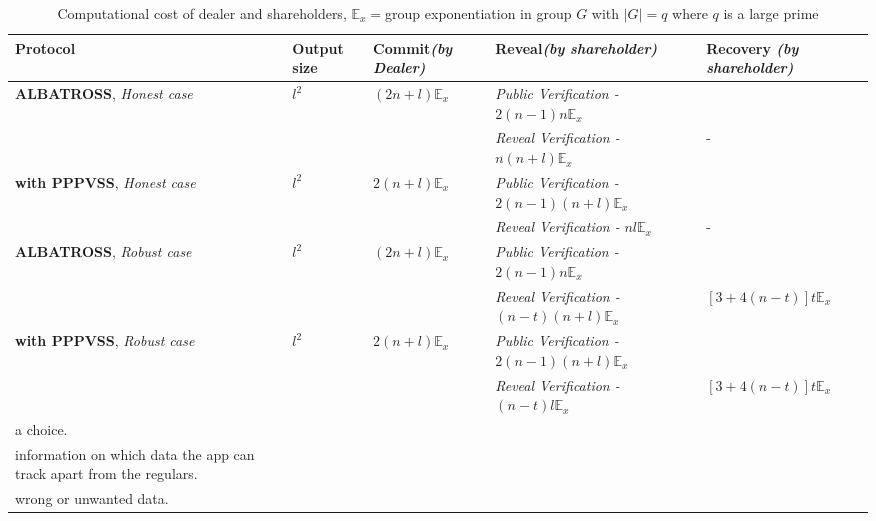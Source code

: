 \begin{table}[H]
\centering
\begin{tabular}{|p{3cm}|p{1.2cm}|p{2cm}|p{6.5cm}|p{2.5cm}|}
\hline
\textbf{Protocol}    & \textbf{Output size}    & 
\textbf{Commit}\textit{(by Dealer)} & \textbf{Reveal}\textit{(by 
shareholder)} & \textbf{Recovery} \textit{(by shareholder)}                                                           
\\ \hline
\textbf{ALBATROSS}, \textit{Honest case}    & $l^2$ & $(2n+l)\mathbb{E}_x$ & 
\textit{Public Verification - }$2(n-1)n\mathbb{E}_x$ & \\
& & & \textit{Reveal Verification - } $n(n+l)\mathbb{E}_x$&- \\ \hline
\textbf{with PPPVSS}, \textit{Honest case}    & $l^2$  & 
$2(n+l)\mathbb{E}_x$ & \textit{Public Verification - 
}$2(n-1)(n+l)\mathbb{E}_x$ &  \\
& & & \textit{Reveal Verification - } $nl\mathbb{E}_x$ & -  \\ \hline
\textbf{ALBATROSS}, \textit{Robust case}    & $l^2$ & $(2n+l)\mathbb{E}_x$ 
& \textit{Public Verification - }$2(n-1)n\mathbb{E}_x$   &  \\
& & & \textit{Reveal Verification - }$(n-t)(n+l)\mathbb{E}_x$ & 
$[3+4(n-t)]t\mathbb{E}_{x}$\\ \hline
\textbf{with PPPVSS}, \textit{Robust case}    & $l^2$  & 
$2(n+l)\mathbb{E}_x$ & \textit{Public Verification - 
}$2(n-1)(n+l)\mathbb{E}_x$ &  \\ 
& & & \textit{Reveal Verification - } $(n-t)l\mathbb{E}_x$ &  
$[3+4(n-t)]t\mathbb{E}_{x}$ \\ \hline

a choice.   \\ \hline
information on which data the app can track apart from the regulars. \\ 
\hline
wrong or unwanted data. \\ \hline

\end{tabular}
\caption{Computational cost of dealer and shareholders, 
$\mathbb{E}_x=$group exponentiation in group $G$ with $|G|=q$ where $q$ is 
a large prime}
\label{tab:comp_alba_pppvss_exp}
\end{table}

